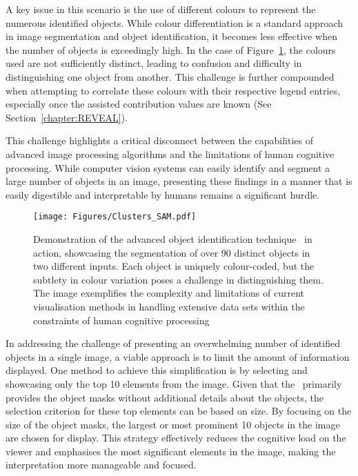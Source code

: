 A key issue in this scenario is the use of different colours to represent the numerous identified objects. While colour differentiation is a standard approach in image segmentation and object identification, it becomes less effective when the number of objects is exceedingly high. In the case of Figure~\ref{Fig:Sam_many_masks}, the colours used are not sufficiently distinct, leading to confusion and difficulty in distinguishing one object from another. This challenge is further compounded when attempting to correlate these colours with their respective legend entries, especially once the assisted contribution values are known (See Section~\ref{chapter:REVEAL}). 

This challenge highlights a critical disconnect between the capabilities of advanced image processing algorithms and the limitations of human cognitive processing. While computer vision systems can easily identify and segment a large number of objects in an image, presenting these findings in a manner that is easily digestible and interpretable by humans remains a significant hurdle. 

\begin{figure}[ht!]
\begin{center}
\texttt{[image: Figures/Clusters\_SAM.pdf]}
\end{center}
\caption{Demonstration of the advanced object identification technique \SAM\ in action, showcasing the segmentation of over 90 distinct objects in two different inputs. Each object is uniquely colour-coded, but the subtlety in colour variation poses a challenge in distinguishing them. The image exemplifies the complexity and limitations of current visualisation methods in handling extensive data sets within the constraints of human cognitive processing }
\label{Fig:Sam_many_masks}
\end{figure} 

In addressing the challenge of presenting an overwhelming number of identified objects in a single image, a viable approach is to limit the amount of information displayed. One method to achieve this simplification is by selecting and showcasing only the top 10 elements from the image. Given that the \SAM\ primarily provides the object masks without additional details about the objects, the selection criterion for these top elements can be based on size. By focusing on the size of the object masks, the largest or most prominent 10 objects in the image are chosen for display. This strategy effectively reduces the cognitive load on the viewer and emphasises the most significant elements in the image, making the interpretation more manageable and focused.


